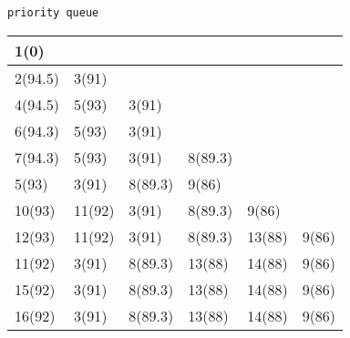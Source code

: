 \documentclass{article}
\begin{document}
\begin{CJK*}{UTF8}{gbsn}
\newpage
\verb|priority queue|

\begin{center}
\begin{tabular}{|l|l|l|l|l|l|}
\hline
1(0)	&		&		&		&		&		\\ \hline
2(94.5)	&3(91)	&		&		&		&		\\ \hline
4(94.5)	&5(93)	&3(91)	&		&		&		\\ \hline
6(94.3)	&5(93)	&3(91)	&		&		&		\\ \hline
7(94.3)	&5(93)	&3(91)	&8(89.3)&		&		\\ \hline
5(93)	&3(91)	&8(89.3)&9(86)	&		&		\\ \hline
10(93)	&11(92)	&3(91)	&8(89.3)&9(86)	&		\\ \hline
12(93)	&11(92)	&3(91)	&8(89.3)&13(88)	&9(86)	\\ \hline
11(92)	&3(91)	&8(89.3)&13(88)	&14(88)	&9(86)	\\ \hline
15(92)	&3(91)	&8(89.3)&13(88)	&14(88)	&9(86)	\\ \hline
16(92)	&3(91)	&8(89.3)&13(88)	&14(88)	&9(86)	\\ \hline
\end{tabular}
\end{center}

\end{CJK*}
\end{document}
